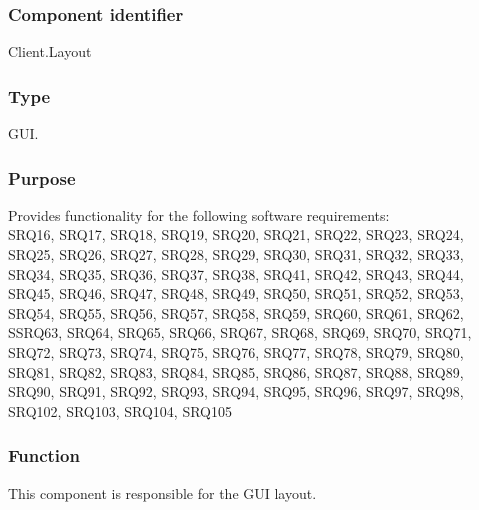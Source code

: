 \subsubsection*{Component identifier}
Client.Layout

\subsubsection*{Type}
GUI.

\subsubsection*{Purpose}
Provides functionality for the following software requirements:\\
SRQ16, SRQ17, SRQ18, SRQ19, SRQ20, SRQ21, SRQ22, SRQ23, SRQ24, SRQ25, SRQ26, SRQ27, SRQ28, SRQ29, SRQ30, SRQ31, SRQ32, SRQ33, SRQ34, SRQ35, SRQ36, SRQ37, SRQ38, SRQ41, SRQ42, SRQ43, SRQ44, SRQ45, SRQ46, SRQ47, SRQ48, SRQ49, SRQ50, SRQ51, SRQ52, SRQ53, SRQ54, SRQ55, SRQ56, SRQ57, SRQ58, SRQ59, SRQ60, SRQ61, SRQ62, SSRQ63, SRQ64, SRQ65, SRQ66, SRQ67, SRQ68, SRQ69, SRQ70, SRQ71, SRQ72, SRQ73, SRQ74, SRQ75, SRQ76, SRQ77, SRQ78, SRQ79, SRQ80, SRQ81, SRQ82, SRQ83, SRQ84, SRQ85, SRQ86, SRQ87, SRQ88, SRQ89, SRQ90, SRQ91, SRQ92, SRQ93, SRQ94, SRQ95, SRQ96, SRQ97, SRQ98, SRQ102, SRQ103, SRQ104, SRQ105

\subsubsection*{Function}
This component is responsible for the GUI layout.

